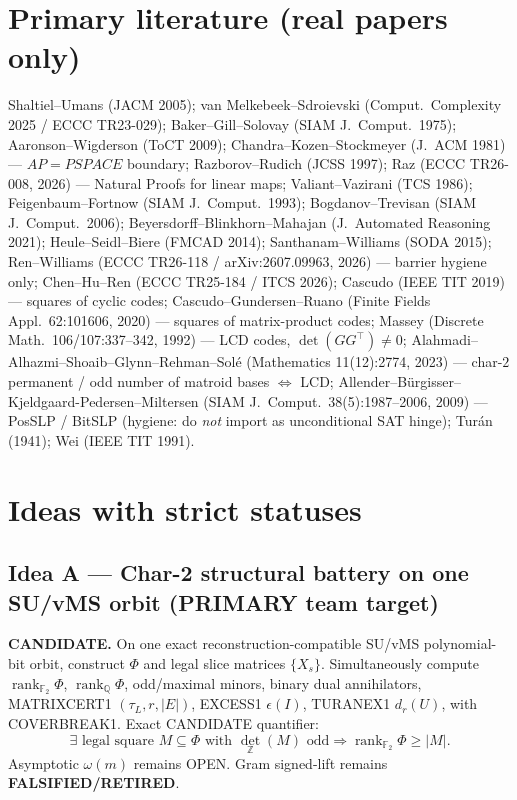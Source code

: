 \documentclass[11pt]{article}
\begin{document}
\section*{Primary literature (real papers only)}
Shaltiel--Umans (JACM 2005); van Melkebeek--Sdroievski (Comput.\ Complexity 2025 / ECCC TR23-029);
Baker--Gill--Solovay (SIAM J.\ Comput.\ 1975); Aaronson--Wigderson (ToCT 2009);
Chandra--Kozen--Stockmeyer (J.\ ACM 1981) --- $AP=PSPACE$ boundary;
Razborov--Rudich (JCSS 1997); Raz (ECCC TR26-008, 2026) --- Natural Proofs for linear maps;
Valiant--Vazirani (TCS 1986); Feigenbaum--Fortnow (SIAM J.\ Comput.\ 1993);
Bogdanov--Trevisan (SIAM J.\ Comput.\ 2006);
Beyersdorff--Blinkhorn--Mahajan (J.\ Automated Reasoning 2021);
Heule--Seidl--Biere (FMCAD 2014); Santhanam--Williams (SODA 2015);
Ren--Williams (ECCC TR26-118 / arXiv:2607.09963, 2026) --- barrier hygiene only;
Chen--Hu--Ren (ECCC TR25-184 / ITCS 2026); Cascudo (IEEE TIT 2019) --- squares of cyclic codes;
Cascudo--Gundersen--Ruano (Finite Fields Appl.\ 62:101606, 2020) --- squares of matrix-product codes;
Massey (Discrete Math.\ 106/107:337--342, 1992) --- LCD codes, $\det(GG^\top)\neq 0$;
Alahmadi--Alhazmi--Shoaib--Glynn--Rehman--Sol\'e (Mathematics 11(12):2774, 2023) ---
char-$2$ permanent / odd number of matroid bases $\Leftrightarrow$ LCD;
Allender--B\"urgisser--Kjeldgaard-Pedersen--Miltersen (SIAM J.\ Comput.\ 38(5):1987--2006, 2009)
--- PosSLP / BitSLP (hygiene: do \emph{not} import as unconditional SAT hinge);
Tur\'an (1941); Wei (IEEE TIT 1991).

\section*{Ideas with strict statuses}
\subsection*{Idea A --- Char-2 structural battery on one SU/vMS orbit (PRIMARY team target)}
\textbf{CANDIDATE.} On one exact reconstruction-compatible SU/vMS polynomial-bit orbit, construct
$\Phi$ and legal slice matrices $\{X_s\}$. Simultaneously compute
$\operatorname{rank}_{\mathbb F_2}\Phi$, $\operatorname{rank}_{\mathbb Q}\Phi$, odd/maximal minors,
binary dual annihilators, MATRIXCERT1 $(\tau_L,r,|E|)$, EXCESS1 $\epsilon(I)$, TURANEX1 $d_r(U)$,
with COVERBREAK1. Exact CANDIDATE quantifier:
\[
\exists\text{ legal square }M\subseteq\Phi\text{ with }\det_{\mathbb Z}(M)\text{ odd}
\Rightarrow\operatorname{rank}_{\mathbb F_2}\Phi\ge|M|.
\]
Asymptotic $\omega(m)$ remains OPEN. Gram signed-lift remains \textbf{FALSIFIED/RETIRED}.
\end{document}
